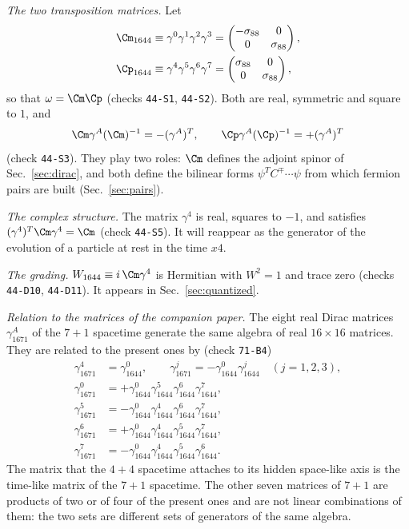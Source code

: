 \emph{The two transposition matrices.} Let
\begin{align}
\Cm_{1644}&\equiv\gamma^0\gamma^1\gamma^2\gamma^3=\begin{pmatrix}-\sigma_{88}&0\\0&\sigma_{88}\end{pmatrix},\nonumber\\
\Cp_{1644}&\equiv\gamma^4\gamma^5\gamma^6\gamma^7=\begin{pmatrix}\sigma_{88}&0\\0&\sigma_{88}\end{pmatrix},
\label{eq:C}
\end{align}
so that $\omega=\Cm\Cp$ (checks \texttt{44-S1}, \texttt{44-S2}). Both are real, symmetric and square
to $1$, and
\begin{equation}
\Cm\gamma^A(\Cm)^{-1}=-(\gamma^A)^T,\qquad\Cp\gamma^A(\Cp)^{-1}=+(\gamma^A)^T
\label{eq:Ctranspose}
\end{equation}
(check \texttt{44-S3}). They play two roles: $\Cm$ defines the adjoint spinor of
Sec.~\ref{sec:dirac}, and both define the bilinear forms $\psi^TC^{\mp}\cdots\psi$ from which fermion
pairs are built (Sec.~\ref{sec:pairs}).

\emph{The complex structure.} The matrix $\gamma^4$ is real, squares to $-1$, and satisfies
$(\gamma^4)^T\Cm\gamma^4=\Cm$ (check \texttt{44-S5}). It will reappear as the generator of the
evolution of a particle at rest in the time $x4$.

\emph{The grading.} $W_{1644}\equiv i\,\Cm\gamma^4$ is Hermitian with $W^2=1$ and trace zero (checks
\texttt{44-D10}, \texttt{44-D11}). It appears in Sec.~\ref{sec:quantized}.

\emph{Relation to the matrices of the companion paper.} The eight real Dirac matrices
$\gamma_{1671}^A$ of the $7+1$ spacetime \cite{Companion1671} generate the same algebra of real
$16\times16$ matrices. They are related to the present ones by (check \texttt{71-B4})
\begin{align}
\gamma_{1671}^4&=\gamma_{1644}^0,\qquad\gamma_{1671}^j=-\gamma_{1644}^0\gamma_{1644}^j\quad(j=1,2,3),\nonumber\\
\gamma_{1671}^0&=+\gamma_{1644}^0\gamma_{1644}^5\gamma_{1644}^6\gamma_{1644}^7,\nonumber\\
\gamma_{1671}^5&=-\gamma_{1644}^0\gamma_{1644}^4\gamma_{1644}^6\gamma_{1644}^7,\nonumber\\
\gamma_{1671}^6&=+\gamma_{1644}^0\gamma_{1644}^4\gamma_{1644}^5\gamma_{1644}^7,\nonumber\\
\gamma_{1671}^7&=-\gamma_{1644}^0\gamma_{1644}^4\gamma_{1644}^5\gamma_{1644}^6 .
\label{eq:relation}
\end{align}
The matrix that the $4+4$ spacetime attaches to its hidden space-like axis is the time-like matrix of
the $7+1$ spacetime. The other seven matrices of $7+1$ are products of two or of four of the present
ones and are not linear combinations of them: the two sets are different sets of generators of the
same algebra.

